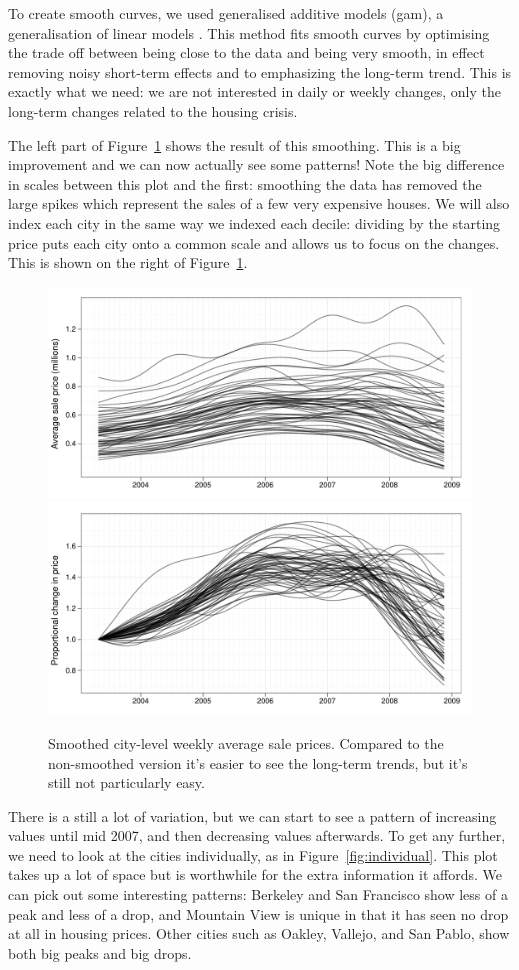 \documentclass[oneside]{article}
\begin{document}
To create smooth curves, we used generalised additive models ({\sc gam}), a generalisation of linear models \citep{wood:2006}.  This method fits smooth curves by optimising the trade off between being close to the data and being very smooth, in effect removing noisy short-term effects and to emphasizing the long-term trend.  This is exactly what we need: we are not interested in daily or weekly changes, only the long-term changes related to the housing crisis.

The left part of Figure~\ref{fig:smoothed} shows the result of this smoothing. This is a big improvement and we can now actually see some patterns! Note the big difference in scales between this plot and the first: smoothing the data has removed the large spikes which represent the sales of a few very expensive houses. We will also index each city in the same way we indexed each decile: dividing by the starting price puts each city onto a common scale and allows us to focus on the changes.  This is shown on the right of Figure~\ref{fig:smoothed}.  

\begin{figure}[htbp]
  \centering
  \includegraphics[width=0.5 \linewidth]{cities-smooth}%
  \includegraphics[width=0.5 \linewidth]{cities-indexed}
  \caption{Smoothed city-level weekly average sale prices.  Compared to the non-smoothed version it's easier to see the long-term trends, but it's still not particularly easy.}
  \label{fig:smoothed}
\end{figure}

There is a still a lot of variation, but we can start to see a pattern of increasing values until mid 2007, and then decreasing values afterwards.  To get any further, we need to look at the cities individually, as in Figure~\ref{fig:individual}.  This plot takes up a lot of space but is worthwhile for the extra information it affords.  We can pick out some interesting patterns: Berkeley and San Francisco show less of a peak and less of a drop, and Mountain View is unique in that it has seen no drop at all in housing prices.  Other cities such as Oakley, Vallejo, and San Pablo, show both big peaks and big drops.
\end{document}
